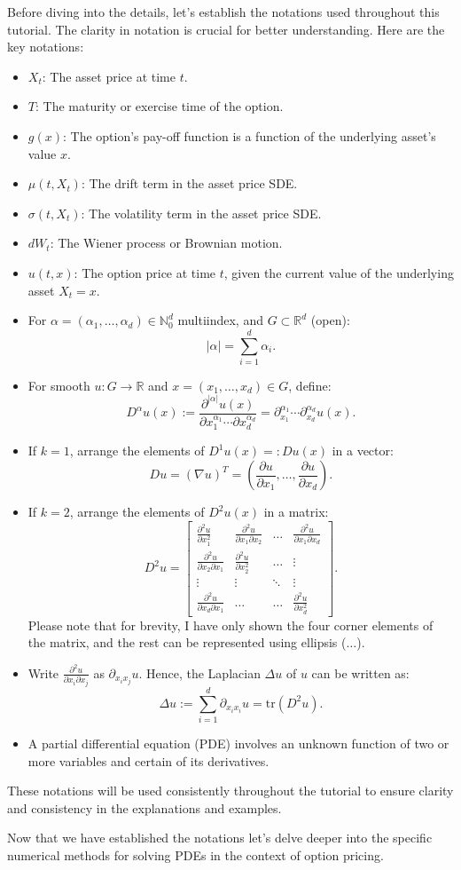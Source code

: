 Before diving into the details, let's establish the notations used throughout this tutorial. The clarity in notation is crucial for better understanding. Here are the key notations:

\begin{itemize}
    \item $X_t$: The asset price at time $t$.
    \item $T$: The maturity or exercise time of the option.
    \item $g(x)$: The option's pay-off function is a function of the underlying asset's value $x$.
    \item $\mu(t, X_t)$: The drift term in the asset price SDE.
    \item $\sigma(t, X_t)$: The volatility term in the asset price SDE.
    \item $dW_t$: The Wiener process or Brownian motion.
    \item $u(t, x)$: The option price at time $t$, given the current value of the underlying asset $X_t = x$.
    \item For $\alpha = (\alpha_1, \ldots, \alpha_d) \in \mathbb{N}_0^d$ multiindex, and $G \subset \mathbb{R}^d$ (open):
    \[|\alpha| = \sum_{i=1}^d \alpha_i.\]
    \item For smooth $u : G \rightarrow \mathbb{R}$ and $x = (x_1, \ldots, x_d) \in G$, define:
    \[D^\alpha u(x) := \frac{{\partial^{|\alpha|} u(x)}}{{\partial x_1^{\alpha_1} \cdots \partial x_d^{\alpha_d}}} = {\partial^{\alpha_1}_{x_1}} \cdots \partial^{\alpha_d}_{x_d} u(x).\]
    \item If $k = 1$, arrange the elements of $D^1 u(x) =: Du(x)$ in a vector:
    \[Du = (\nabla u)^T = \left(\frac{{\partial u}}{{\partial x_1}}, \ldots, \frac{{\partial u}}{{\partial x_d}}\right).\]
    \item If $k = 2$, arrange the elements of $D^2 u(x)$ in a matrix:
    \[D^2 u = \begin{bmatrix}
    \frac{{\partial^2 u}}{{\partial x_1^2}} & \frac{{\partial^2 u}}{{\partial x_1 \partial x_2}} & \ldots & \frac{{\partial^2 u}}{{\partial x_1 \partial x_d}} \\
    \frac{{\partial^2 u}}{{\partial x_2 \partial x_1}} & \frac{{\partial^2 u}}{{\partial x_2^2}} & \ldots & \vdots \\
    \vdots & \vdots & \ddots & \vdots \\
    \frac{{\partial^2 u}}{{\partial x_d \partial x_1}} & \ldots & \ldots & \frac{{\partial^2 u}}{{\partial x_d^2}}
    \end{bmatrix}.\]
    Please note that for brevity, I have only shown the four corner elements of the matrix, and the rest can be represented using ellipsis ($\ldots$).
    \item Write $\frac{{\partial^2 u}}{{\partial x_i \partial x_j}}$ as ${\partial_{x_i x_j} u}$. Hence, the Laplacian $\Delta u$ of $u$ can be written as:
    \[\Delta u := \sum_{i=1}^{d} \partial_{x_i x_i} u = \text{tr}(D^2 u).\]
    \item A partial differential equation (PDE) involves an unknown function of two or more variables and certain of its derivatives.
\end{itemize}

These notations will be used consistently throughout the tutorial to ensure clarity and consistency in the explanations and examples.

Now that we have established the notations let's delve deeper into the specific numerical methods for solving PDEs in the context of option pricing.
